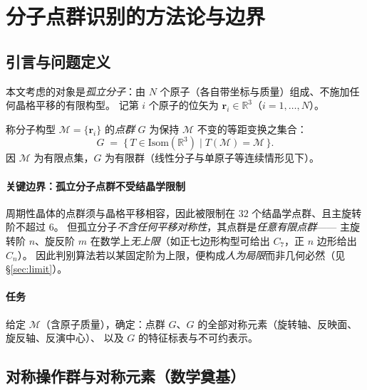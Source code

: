 
\section{分子点群识别的方法论与边界}

\subsection{引言与问题定义}\label{sec:intro}

本文考虑的对象是\emph{孤立分子}：由 $N$ 个原子（各自带坐标与质量）组成、不施加任何晶格平移的有限构型。
记第 $i$ 个原子的位矢为 $\mathbf r_i\in\mathbb R^3$（$i=1,\dots,N$）。

\begin{definition}[分子点群]
  称分子构型 $\mathcal M=\{\mathbf r_i\}$ 的\emph{点群} $G$ 为保持 $\mathcal M$ 不变的等距变换之集合：
  \begin{equation}
    G \;=\; \bigl\{\, T\in \mathrm{Isom}(\mathbb R^3) \;\big|\; T(\mathcal M)=\mathcal M \,\bigr\}.
  \end{equation}
  因 $\mathcal M$ 为有限点集，$G$ 为有限群（线性分子与单原子等连续情形见下）。
\end{definition}

\paragraph{关键边界：孤立分子点群不受结晶学限制}
周期性晶体的点群须与晶格平移相容，因此被限制在 $32$ 个结晶学点群、且主旋转阶不超过 $6$。
但孤立分子\emph{不含任何平移对称性}，其点群是\emph{任意有限点群}——
主旋转阶 $n$、旋反阶 $m$ 在数学上\emph{无上限}（如正七边形构型可给出 $C_7$，正 $n$ 边形给出 $C_n$）。
因此判别算法若以某固定阶为上限，便构成\emph{人为局限}而非几何必然（见 \S\ref{sec:limit}）。

\paragraph{任务}
给定 $\mathcal M$（含原子质量），确定：点群 $G$、$G$ 的全部对称元素（旋转轴、反映面、旋反轴、反演中心）、
以及 $G$ 的特征标表与不可约表示。

\subsection{对称操作群与对称元素（数学奠基）}


